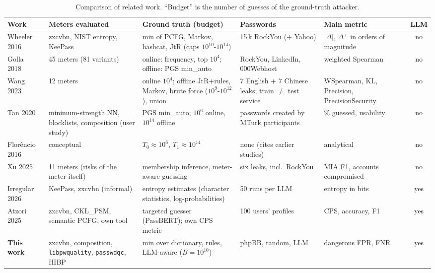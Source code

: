 \documentclass[conference]{IEEEtran}
\begin{document}
\begin{table}[t]
\centering
\caption{Comparison of related work. ``Budget'' is the number of guesses of the ground-truth attacker.}
\label{tab:related}
\footnotesize
\renewcommand{\arraystretch}{1.15}
\begin{tabularx}{\textwidth}{@{}l Y Y Y Y c@{}}
\toprule
\textbf{Work} & \textbf{Meters evaluated} & \textbf{Ground truth (budget)} & \textbf{Passwords} & \textbf{Main metric} & \textbf{LLM}\\
\midrule
Wheeler 2016~\cite{wheeler2016} & zxcvbn, NIST entropy, KeePass & min of PCFG, Markov, hashcat, JtR (caps $10^{10}$-$10^{14}$) & 15\,k RockYou (+ Yahoo) & $|\Delta|$, $\Delta^+$ in orders of magnitude & no\\
Golla 2018~\cite{golla2018} & 45 meters (81 variants) & online: frequency, top $10^4$; offline: PGS min\_auto & RockYou, LinkedIn, 000Webhost & weighted Spearman & no\\
Wang 2023~\cite{wang2023} & 12 meters & online $10^4$; offline JtR+rules, Markov, brute force ($10^9$-$10^{12}$), union & 7 English + 7 Chinese leaks; train $\neq$ test service & WSpearman, KL, Precision, PrecisionSecurity & no\\
Tan 2020~\cite{tan2020} & minimum-strength NN, blocklists, composition (user study) & PGS min\_auto; $10^6$ online, $10^{14}$ offline & passwords created by MTurk participants & \% guessed, usability & no\\
Flor\^encio 2016~\cite{florencio2016} & conceptual & $T_0\approx10^6$, $T_1\approx10^{14}$ & none (cites earlier studies) & analytical & no\\
Xu 2025~\cite{xu2025} & 11 meters (risks of the meter itself) & membership inference, meter-aware guessing & six leaks, incl.\ RockYou & MIA F1, accounts compromised & no\\
Irregular 2026~\cite{irregular2026} & KeePass, zxcvbn (informal) & entropy estimates (character statistics, log-probabilities) & 50 runs per LLM & entropy in bits & yes\\
Atzori 2025~\cite{atzori2025} & zxcvbn, CKL\_PSM, semantic PCFG, own tool & targeted guesser (PassBERT); own CPS metric & 100 users' profiles & CPS, accuracy, F1 & yes\\
\midrule
\textbf{This work} & zxcvbn, composition, \texttt{libpwquality}, \texttt{passwdqc}, HIBP & min over dictionary, rules, LLM-aware ($B=10^{10}$) & phpBB, random, LLM & dangerous FPR, FNR & yes\\
\bottomrule
\end{tabularx}
\end{table}
\end{document}
